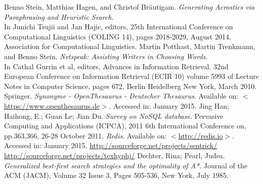 \documentclass{reportAlternative}
\begin{document}
\begin{thebibliography}{1}
	Benno Stein, Matthias Hagen, and Christof Bräutigam. \emph{Generating Acrostics via Paraphrasing and Heuristic Search}. \\
	In Junichi Tsujii and Jan Hajic, editors, 25th International Conference on Computational Linguistics (COLING 14), pages 2018-2029, August 2014. Association for Computational Linguistics.
	Martin Potthast, Martin Trenkmann, and Benno Stein.
	\emph{Netspeak: Assisting Writers in Choosing Words}. \\
	In Cathal Gurrin et al, editors, Advances in Information Retrieval. 32nd European Conference on Information Retrieval (ECIR 10) volume 5993 of Lecture Notes in Computer Science, pages 672, Berlin Heidelberg New York, March 2010. Springer.
	\emph{Synonyme - OpenThesaurus - Deutscher Thesaurus}.
	Available on: $<$\url{https://www.openthesaurus.de}$>$.
	Accessed in: January 2015.
	Jing Han; Haihong, E.; Guan Le; Jian Du. \emph{Survey on NoSQL database}. Pervasive Computing and Applications (ICPCA), 2011 6th International Conference on, pp.363,366, 26-28 October 2011.
	\emph{Redis}.
	Available on: $<$\url{http://redis.io}$>$.
	Accessed in: January 2015.
\url{http://sourceforge.net/projects/sentrick/}
\url{http://sourceforge.net/projects/texhyphj/}
	Dechter, Rina; Pearl, Judea. \emph{Generalized best-first search strategies and the optimality of A*}. Journal of the ACM (JACM), Volume 32 Issue 3, Pages 505-536, New York, July 1985.
\end{thebibliography}

\end{document}
